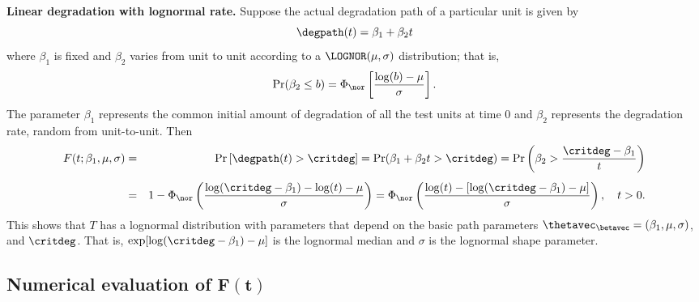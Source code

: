 \begin{example}{\bfseries Linear degradation with lognormal rate.}
\label{example:closed_form_lognormal}
Suppose the actual degradation path of a particular unit is given by
\begin{displaymath} 
\degpath(t) = \beta_{1} + \beta_{2} t
\end{displaymath} 
where
$\beta_{1}$ is fixed and $\beta_{2}$ varies from unit to unit according to a
$\LOGNOR(\mu, \sigma)$ distribution; that is,
\begin{displaymath} 
\Pr(\beta_{2} \leq b)  = 
\Phi_{\nor} \left[ \frac{\log(b)-\mu}{\sigma}\right].
\end{displaymath} 
The parameter $\beta_{1}$ represents
the common initial amount of degradation of all the test units at
time 0 and $\beta_{2}$ represents
the degradation rate, random from unit-to-unit.
Then
\begin{eqnarray*}
F(t;\beta_{1}, \mu, \sigma) &=& \Pr\left[\degpath(t) > \critdeg \right] = 
	\Pr(\beta_{1} + \beta_{2} t> \critdeg) = \Pr \left (\beta_{2} >
\frac{\critdeg - \beta_{1}}{t} \right ) \\[1ex]
	 &=& 1-  
\Phi_{\nor}\left(\frac{\log(\critdeg - \beta_{1}) - \log(t) - \mu}{\sigma}\right)  = 
\Phi_{\nor}\left(\frac{\log(t) - \left[ \log(\critdeg - \beta_{1} ) - \mu \right]}
{\sigma}\right), \quad t>0. 
\end{eqnarray*}
This shows that $T$ has a lognormal distribution with parameters
that depend on the basic path parameters
$\thetavec_{\betavec}=(\beta_{1}, \mu, \sigma)$, and $\critdeg$. That
is, $\exp[ \log(\critdeg - \beta_{1} ) - \mu ]$ is the
lognormal median and $\sigma$ is the lognormal shape parameter.
\end{example}

\subsection{Numerical evaluation of $\boldsymbol{F(t)}$}

